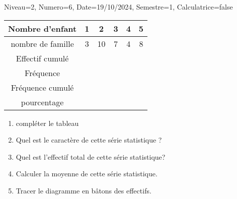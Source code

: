 \documentclass[a4paper,12pt]{article}
\begin{document}
\begin{Maquette}[DS]{Niveau=2, Numero=6, Date=19/10/2024, Semestre=1, Calculatrice=false}
\begin{exercice}
\begin{tabular}{|c|c|c|c|c|c|}
\hline 
Nombre d'enfant & 1 & 2 & 3 & 4 & 5 \\ 
\hline 
nombre de famille & 3 & 10 & 7 & 4 & 8 \\ 
\hline 
Effectif cumulé  &  &  &  &  &  \\ 
\hline
Fréquence  &  &  &  &  &  \\ 
\hline 
Fréquence cumulé  &  &  &  &  &  \\ 
\hline
pourcentage &  &  &  &  &  \\ 
\hline 
\end{tabular} 
\begin{enumerate}
\item{} compléter le tableau
\item{} Quel est le caractère de cette série statistique ?\anserline[1]
\item{} Quel est l'effectif total de cette série statistique?\anserline[1]
\item{} Calculer la moyenne de cette série statistique.\anserline[2]
\item{} Tracer le diagramme en bâtons des effectifs.

\anserline[14]
\end{enumerate}
\end{exercice}

\end{Maquette}
\end{document}
